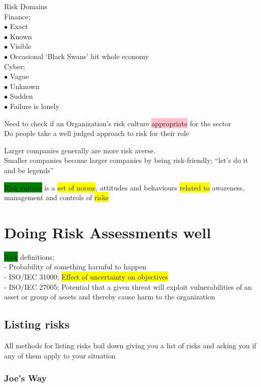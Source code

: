 \documentclass[tikz,border=10pt]{project_plan}
\newcommand{\bulletPoint}{\hspace{-3.1pt}$\bullet$ \hspace{5pt}}
\begin{document}
Risk Domains\\
Finance;\\
\bulletPoint Exact \\
\bulletPoint Known \\
\bulletPoint Visible\\
\bulletPoint Occasional ‘Black Swans’ hit whole economy\\
Cyber;\\
\bulletPoint Vague \\
\bulletPoint Unknown \\
\bulletPoint Sudden\\
\bulletPoint Failure is lonely

Need to check if an Organization's risk culture \colorbox{pink}{appropriate} for the sector\\
Do people take a well judged approach to risk for their role

Larger companies generally are more risk averse.  \\
Smaller companies become larger companies by being risk-friendly;
“let’s do it and be legends”

\colorbox{green}{Risk culture} is a \colorbox{yellow}{set of norms}, attitudes
and behaviours \colorbox{yellow}{related to} awareness, management and controls of \colorbox{yellow}{risks}

\section{Doing Risk Assessments well}

\colorbox{green}{Risk} definitions;\\
- Probability of something harmful to happen\\
- ISO/IEC 31000; \colorbox{yellow}{Effect of uncertainty on objectives}\\
- ISO/IEC 27005; Potential that a given threat will exploit vulnerabilities of
an asset or group of assets and thereby cause harm to the organization

\subsection{Listing risks}

All methods for listing risks boil down giving you a list of risks and asking
you if any of them apply to your situation

\subsubsection{Joe's Way}
\end{document}
